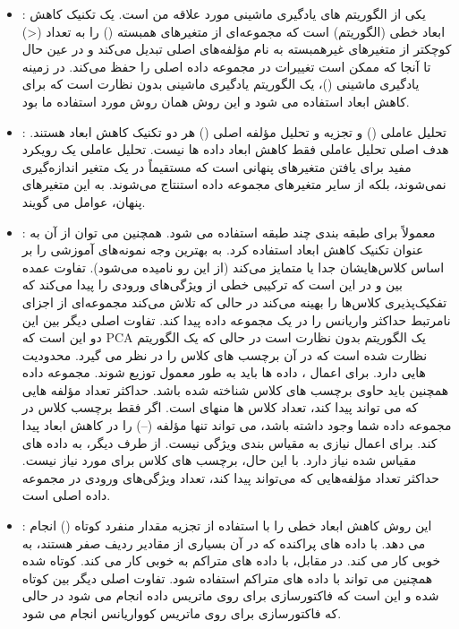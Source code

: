 \documentclass[12pt]{article}
\begin{document}
   \begin{itemize}
	
	\item 
: 
 یکی از الگوریتم های یادگیری ماشینی مورد علاقه من است.  یک تکنیک کاهش ابعاد خطی (الگوریتم) است که مجموعه‌ای از متغیرهای همبسته () را به تعداد 
  (<)
  کوچکتر از متغیرهای غیرهمبسته به نام مؤلفه‌های اصلی تبدیل می‌کند و در عین حال تا آنجا که ممکن است تغییرات در مجموعه داده اصلی را حفظ می‌کند. در زمینه یادگیری ماشینی ()،  یک الگوریتم یادگیری ماشینی بدون نظارت است که برای کاهش ابعاد استفاده می شود و این روش همان روش مورد استفاده ما بود.
  
	\item 	
	:
تحلیل عاملی () و تجزیه و تحلیل مؤلفه اصلی () هر دو تکنیک کاهش ابعاد هستند. هدف اصلی تحلیل عاملی فقط کاهش ابعاد داده ها نیست. تحلیل عاملی یک رویکرد مفید برای یافتن متغیرهای پنهانی است که مستقیماً در یک متغیر اندازه‌گیری نمی‌شوند، بلکه از سایر متغیرهای مجموعه داده استنتاج می‌شوند. به این متغیرهای پنهان، عوامل می گویند.
	\item
	:
 معمولاً برای طبقه بندی چند طبقه استفاده می شود. همچنین می توان از آن به عنوان تکنیک کاهش ابعاد استفاده کرد.  به بهترین وجه نمونه‌های آموزشی را بر اساس کلاس‌هایشان جدا یا متمایز می‌کند (از این رو  نامیده می‌شود). تفاوت عمده بین  و  در این است که  ترکیبی خطی از ویژگی‌های ورودی را پیدا می‌کند که تفکیک‌پذیری کلاس‌ها را بهینه می‌کند در حالی که  تلاش می‌کند مجموعه‌ای از اجزای نامرتبط حداکثر واریانس را در یک مجموعه داده پیدا کند. تفاوت اصلی دیگر بین این دو این است که PCA یک الگوریتم بدون نظارت است در حالی که  یک الگوریتم نظارت شده است که در آن برچسب های کلاس را در نظر می گیرد.  محدودیت هایی دارد. برای اعمال ، داده ها باید به طور معمول توزیع شوند. مجموعه داده همچنین باید حاوی برچسب های کلاس شناخته شده باشد. حداکثر تعداد مؤلفه هایی که  می تواند پیدا کند، تعداد کلاس ها منهای  است. اگر فقط  برچسب کلاس در مجموعه داده شما وجود داشته باشد،  می تواند تنها  مؤلفه (–) را در کاهش ابعاد پیدا کند. برای اعمال  نیازی به مقیاس بندی ویژگی نیست. از طرف دیگر،  به داده های مقیاس شده نیاز دارد. با این حال، برچسب های کلاس برای  مورد نیاز نیست. حداکثر تعداد مؤلفه‌هایی که  می‌تواند پیدا کند، تعداد ویژگی‌های ورودی در مجموعه داده اصلی است.
	
	\item  
	:
این روش کاهش ابعاد خطی را با استفاده از تجزیه مقدار منفرد کوتاه () انجام می دهد. با داده های پراکنده که در آن بسیاری از مقادیر ردیف صفر هستند، به خوبی کار می کند. در مقابل،  با داده های متراکم به خوبی کار می کند.  کوتاه شده همچنین می تواند با داده های متراکم استفاده شود. تفاوت اصلی دیگر بین  کوتاه شده و  این است که فاکتورسازی برای  روی ماتریس داده انجام می شود در حالی که فاکتورسازی برای  روی ماتریس کوواریانس انجام می شود.

\end{itemize}
\end{document}
